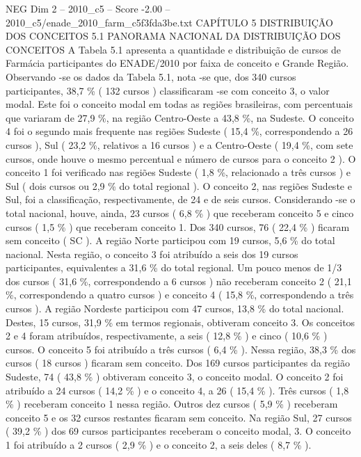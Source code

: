 \begin{textsample}{NEG Dim 2 – 2010\_c5 – Score -2.00 – 2010\_c5/enade\_2010\_farm\_c5f3fda3be.txt}  \label{ex:f2_neg_110}
CAPÍTULO 5 DISTRIBUIÇÃO DOS CONCEITOS 5.1 PANORAMA NACIONAL DA DISTRIBUIÇÃO DOS CONCEITOS A Tabela 5.1 apresenta a quantidade e distribuição de cursos de Farmácia participantes do ENADE/2010 por faixa de conceito e Grande Região.
Observando -se os dados da Tabela 5.1, nota -se que, dos 340 cursos participantes, 38,7 \% ( 132 cursos ) classificaram -se com conceito 3, o valor modal.
Este foi o conceito modal em todas as regiões brasileiras, com percentuais que variaram de 27,9 \%, na região Centro-Oeste a 43,8 \%, na Sudeste.
O conceito 4 foi o segundo mais frequente nas regiões Sudeste ( 15,4 \%, correspondendo a 26 cursos ), Sul ( 23,2 \%, relativos a 16 cursos ) e a Centro-Oeste ( 19,4 \%, com sete cursos, onde houve o mesmo percentual e número de cursos para o conceito 2 ).
O conceito 1 foi verificado nas regiões Sudeste ( 1,8 \%, relacionado a três cursos ) e Sul ( dois cursos ou 2,9 \% do total regional ).
O conceito 2, nas regiões Sudeste e Sul, foi a classificação, respectivamente, de 24 e de seis cursos.
Considerando -se o total nacional, houve, ainda, 23 cursos ( 6,8 \% ) que receberam conceito 5 e cinco cursos ( 1,5 \% ) que receberam conceito 1.
Dos 340 cursos, 76 ( 22,4 \% ) ficaram sem conceito ( SC ).
A região Norte participou com 19 cursos, 5,6 \% do total nacional.
Nesta região, o conceito 3 foi atribuído a seis dos 19 cursos participantes, equivalentes a 31,6 \% do total regional.
Um pouco menos de 1/3 dos cursos ( 31,6 \%, correspondendo a 6 cursos ) não receberam conceito 2 ( 21,1 \%, correspondendo a quatro cursos ) e conceito 4 ( 15,8 \%, correspondendo a três cursos ).
A região Nordeste participou com 47 cursos, 13,8 \% do total nacional.
Destes, 15 cursos, 31,9 \% em termos regionais, obtiveram conceito 3.
Os conceitos 2 e 4 foram atribuídos, respectivamente, a seis ( 12,8 \% ) e cinco ( 10,6 \% ) cursos.
O conceito 5 foi atribuído a três cursos ( 6,4 \% ).
Nessa região, 38,3 \% dos cursos ( 18 cursos ) ficaram sem conceito.
Dos 169 cursos participantes da região Sudeste, 74 ( 43,8 \% ) obtiveram conceito 3, o conceito modal.
O conceito 2 foi atribuído a 24 cursos ( 14,2 \% ) e o conceito 4, a 26 ( 15,4 \% ).
Três cursos ( 1,8 \% ) receberam conceito 1 nessa região.
Outros dez cursos ( 5,9 \% ) receberam conceito 5 e os 32 cursos restantes ficaram sem conceito.
Na região Sul, 27 cursos ( 39,2 \% ) dos 69 cursos participantes receberam o conceito modal, 3.
O conceito 1 foi atribuído a 2 cursos ( 2,9 \% ) e o conceito 2, a seis deles ( 8,7 \% ).

\end{textsample}
